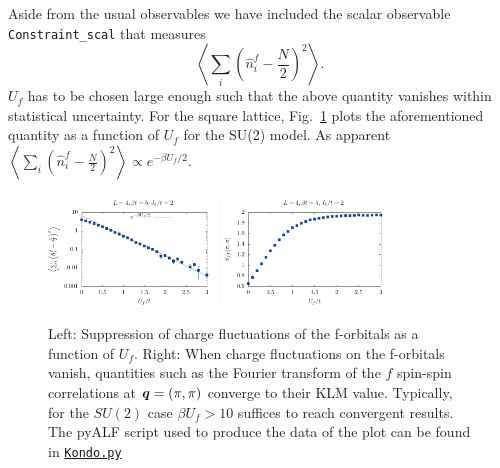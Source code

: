 Aside from the usual observables  we have included  the scalar observable \texttt{Constraint\_scal}    that measures 
\begin{equation}
	\left<    \sum_{i}   \left( \hat{n}_i^f - \frac{N}{2} \right)^2 \right>.
\end{equation}
$U_f$ has to be chosen large enough  such that  the above quantity vanishes within statistical uncertainty.  For the square lattice,  Fig.~\ref{Constraint.fig}   plots   the  aforementioned quantity as a function of $U_f$  for the SU(2) model.  As apparent $ \left<    \sum_{i}   \left( \hat{n}_i^f - \frac{N}{2} \right)^2 \right> \propto e^{-\beta U_f/2} $.
\begin{figure}
\center
\includegraphics[width=0.4\textwidth]{Figures/Kondo/Constraint.pdf}
\includegraphics[width=0.4\textwidth]{Figures/Kondo/Spin.pdf}

\caption{Left:  Suppression of charge fluctuations of the f-orbitals as a function of $U_f$.  Right:   When  charge fluctuations  on the f-orbitals vanish, quantities such as the Fourier transform of the $f$ spin-spin  correlations at $\boldsymbol{q} = (\pi,\pi) $  converge to their KLM value. Typically,  for the $SU(2)$ case $\beta U_f > 10 $ suffices to reach convergent results.
The pyALF script used to produce the data of  the plot can be found in \href{https://git.physik.uni-wuerzburg.de/ALF/ALF/-/blob/master/Documentation/Figures/Kondo/Kondo.py}{\texttt{Kondo.py}}  }
        \label{Constraint.fig}
\end{figure}


